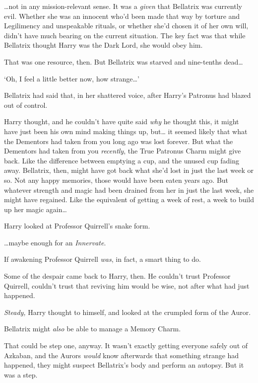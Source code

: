 {\ldots}not in any mission-relevant sense. It was a \emph{given} that Bellatrix was currently evil. Whether she was an innocent who'd been made that way by torture and Legilimency and unspeakable rituals, or whether she'd chosen it of her own will, didn't have much bearing on the current situation. The key fact was that while Bellatrix thought Harry was the Dark Lord, she would obey him.

That was one resource, then. But Bellatrix was starved and nine-tenths dead{\ldots}

`Oh, I feel a little better now, how strange{\ldots}'

Bellatrix had said that, in her shattered voice, after Harry's Patronus had blazed out of control.

Harry thought, and he couldn't have quite said \emph{why} he thought this, it might have just been his own mind making things up, but{\ldots} it seemed likely that what the Dementors had taken from you long ago was lost forever. But what the Dementors had taken from you \emph{recently}, the True Patronus Charm might give back. Like the difference between emptying a cup, and the unused cup fading away. Bellatrix, then, might have got back what she'd lost in just the last week or so. Not any happy memories, those would have been eaten years ago. But whatever strength and magic had been drained from her in just the last week, she might have regained. Like the equivalent of getting a week of rest, a week to build up her magic again{\ldots}

Harry looked at Professor Quirrell's snake form.

{\ldots}maybe enough for an \emph{Innervate}.

If awakening Professor Quirrell \emph{was}, in fact, a smart thing to do.

Some of the despair came back to Harry, then. He couldn't trust Professor Quirrell, couldn't trust that reviving him would be wise, not after what had just happened.

\emph{Steady,} Harry thought to himself, and looked at the crumpled form of the Auror.

Bellatrix might \emph{also} be able to manage a Memory Charm.

That could be step one, anyway. It wasn't exactly getting everyone safely out of Azkaban, and the Aurors \emph{would} know afterwards that something strange had happened, they might suspect Bellatrix's body and perform an autopsy. But it was a step.

